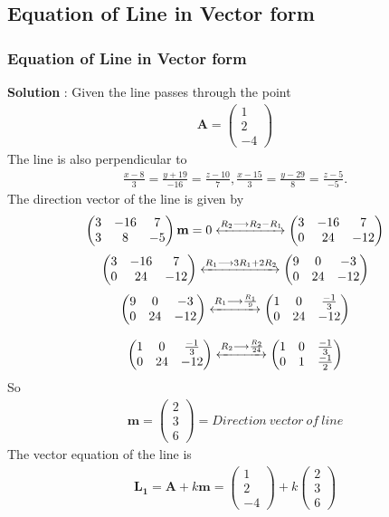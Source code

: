 \documentclass{beamer}
\theoremstyle{remark}
\newcommand{\myvec}[1]{\ensuremath{\begin{pmatrix}#1\end{pmatrix}}}
\let\vec\mathbf
\numberwithin{equation}{section}
\begin{document}
\subsection{Equation of Line in Vector form}
\begin{frame}
\frametitle{Equation of Line in Vector form}
\textbf{Solution} :
 Given the line passes through the point
\begin{align}
\vec{A} = \myvec{1\\2\\-4}
\end{align}
The line is also perpendicular to
\begin{align}
\frac{x-8}{3} = \frac{y+19}{-16} = \frac{z-10}{7} ,
\frac{x-15}{3} = \frac{y-29}{8} = \frac{z-5}{-5}.
\end{align}
The direction vector of the line is given by
\begin{align}
\myvec{
3 & -16 & 7 \\
3 & 8 & -5} \vec{m} = 0 \xleftrightarrow{R_2\longrightarrow R_2-R_1}
\myvec{
3 & -16 & 7 \\
0 & 24 & -12}
\end{align}
\begin{align}
\myvec{
3 & -16 & 7 \\
0 & 24 & -12} \xleftrightarrow{R_1\longrightarrow 3R_1+2R_2}
\myvec{
9 & 0 & -3 \\
0 & 24 & -12}
\end{align}
\begin{align}
\myvec{
9 & 0 & -3 \\
0 & 24 & -12} \xleftrightarrow{R_1\longrightarrow \frac{R_1}{9}}
\myvec{
1 & 0 & \frac{-1}{3} \\
0 & 24 & -12}
\end{align}
\end{frame}
\begin{frame}
\begin{align}
\myvec{
1 & 0 & \frac{-1}{3} \\
0 & 24 & -12} \xleftrightarrow{R_2\longrightarrow \frac{R_2}{24}}
\myvec{
1 & 0 & \frac{-1}{3} \\
0 & 1 & \frac{-1}{2}} 
\end{align}
So \begin{align}
\vec{m}=\myvec{2\\3\\6} = Direction \ vector \ of \ line
\end{align}
The vector equation of the line is
\begin{align}
\vec{L_1} = \vec{A}+k\vec{m} = \myvec{1\\2\\-4}+k\myvec{2\\3\\6}
\end{align}

\end{frame}
\end{document}
